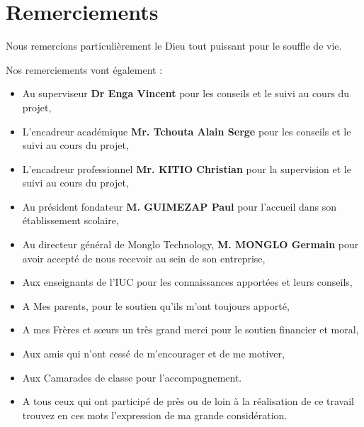 \chapter*{Remerciements}         %

Nous remercions particulièrement le Dieu tout puissant pour le souffle de vie.

Nos remerciements vont également :

\begin{itemize}
    \item Au superviseur \textbf{Dr Enga Vincent} pour les conseils et le suivi au cours du projet,
    \item  L’encadreur académique  \textbf{Mr. Tchouta Alain Serge} pour les conseils et le suivi au
    cours du projet,
    \item  L’encadreur professionnel \textbf{Mr. KITIO Christian} pour la supervision
    et le suivi au cours du projet,
    \item Au président fondateur \textbf{M. GUIMEZAP Paul} pour l’accueil dans son établissement
    scolaire,
    \item Au directeur général de Monglo Technology, \textbf{M. MONGLO Germain} pour avoir accepté de
    nous recevoir au sein de son entreprise,
    \item Aux enseignants de l’IUC pour les connaissances apportées et leurs conseils,
    \item A Mes parents, pour le soutien qu’ils m’ont toujours apporté,
    \item A mes Frères et sœurs un très grand merci pour le soutien financier et moral,
    \item Aux amis qui n’ont cessé de m’encourager et de me motiver,
    \item Aux Camarades de classe pour l’accompagnement.
    \item A tous ceux qui ont participé de près ou de loin à la réalisation de ce travail trouvez en
    ces mots l’expression de ma grande considération.
\end{itemize}